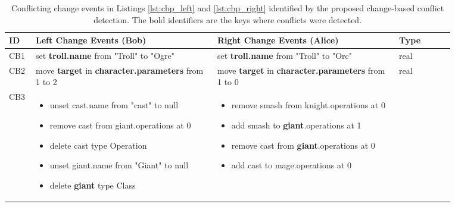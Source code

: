 \begin{table*}[ht]
  \centering
  \caption{Conflicting change events in Listings \ref{lst:cbp_left} and \ref{lst:cbp_right} identified by the proposed change-based conflict detection. The bold identifiers are the keys where conflicts were detected.}
  \label{table:conflicts_cbp}
  \begin{scriptsize}
    \begin{tabular}{|p{0.04\linewidth}|p{0.36\linewidth}|p{0.36\linewidth}|
        p{0.11\linewidth}|}
      \hline
      \textbf{ID} &
      \textbf{Left Change Events (Bob)} &
      \textbf{Right Change Events (Alice)} &
      \textbf{Type}\\
      \hline
      CB1 &
      set \textbf{troll.name} from "Troll" to "Ogre" &
      set \textbf{troll.name} from "Troll" to "Orc" &
      real \\
      \hline
      CB2 & move \textbf{target} in \textbf{character.parameters} from 1 to 2 &
      move \textbf{target} in \textbf{character.parameters} from 1 to 0 &
      real \\
      \hline
      CB3 &
      \begin{minipage}[t]{\linewidth}
        \raggedright
        \begin{itemize}[leftmargin=0pt]
          \setlength
          \item[] unset cast.name from "cast" to null
          \item[] remove cast from giant.operations at 0
          \item[] delete cast type Operation
          \item[] unset giant.name from "Giant" to null
          \item[] delete \textbf{giant} type Class
        \end{itemize}
      \end{minipage}
      &
      \begin{minipage}[t]{\linewidth}
        \raggedright
        \begin{itemize}[leftmargin=0pt]
          \setlength
          \item[] remove smash from knight.operations at 0
          \item[] add smash to \textbf{giant}.operations at 1
          \item[] remove cast from \textbf{giant}.operations at 0
          \item[] add cast to mage.operations at 0
        \end{itemize}
      \end{minipage}

\end{tabular}
\end{scriptsize}
\end{table*}
